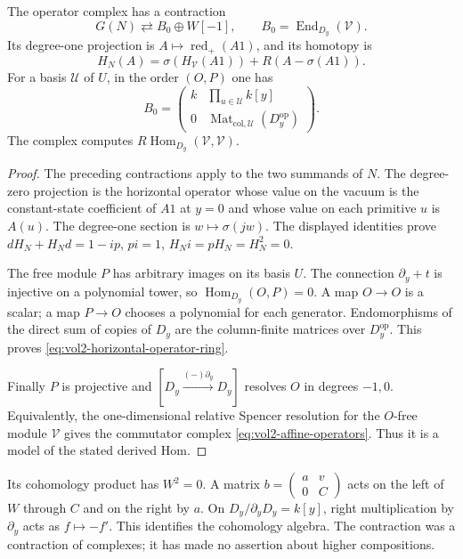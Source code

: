 \begin{theorem}\label{thm:vol2-polynomial-operators}
The operator complex has a contraction
\[
 G(N)\rightleftarrows B_0\oplus W[-1],
 \qquad B_0=\operatorname{End}_{D_y}(\mathcal V).
\]
Its degree-one projection is $A\mapsto\operatorname{red}_+(A1)$,
and its homotopy is
\begin{equation}\label{eq:vol2-operator-homotopy}
 H_N(A)=\sigma(H_{\mathcal V}(A1))+R(A-\sigma(A1)).
\end{equation}
For a basis $\mathcal U$ of $U$, in the order $(O,P)$ one has
\begin{equation}\label{eq:vol2-horizontal-operator-ring}
 B_0=\begin{pmatrix}
 k&\displaystyle\prod_{u\in\mathcal U}k[y]\\
 0&\operatorname{Mat}_{\mathrm{col},\mathcal U}(D_y^{\mathrm{op}})
 \end{pmatrix}.
\end{equation}
The complex computes $R\operatorname{Hom}_{D_y}(\mathcal V,\mathcal V)$.
\end{theorem}
\begin{proof}
The preceding contractions apply to the two summands of $N$.
The degree-zero projection is the horizontal operator whose value
on the vacuum is the constant-state coefficient of $A1$ at $y=0$
and whose value on each primitive $u$ is $A(u)$. The degree-one
section is $w\mapsto\sigma(jw)$. The displayed identities prove
$dH_N+H_Nd=1-ip$, $pi=1$, $H_Ni=pH_N=H_N^2=0$.

The free module $P$ has arbitrary images on its basis $U$.
The connection $\partial_y+t$ is injective on a polynomial tower,
so $\operatorname{Hom}_{D_y}(O,P)=0$. A map $O\to O$ is a
scalar; a map $P\to O$ chooses a polynomial for each generator.
Endomorphisms of the direct sum of copies of $D_y$ are the
column-finite matrices over $D_y^{\mathrm{op}}$. This proves
\eqref{eq:vol2-horizontal-operator-ring}.

Finally $P$ is projective and
$[D_y\xrightarrow{(-)\partial_y}D_y]$ resolves $O$ in degrees
$-1,0$. Equivalently, the one-dimensional relative Spencer
resolution for the $O$-free module $\mathcal V$ gives the
commutator complex \eqref{eq:vol2-affine-operators}. Thus it is
a model of the stated derived Hom.
\end{proof}

Its cohomology product has $W^2=0$. A matrix
$b=\left(\begin{smallmatrix}a&v\\0&C\end{smallmatrix}\right)$
acts on the left of $W$ through $C$ and on the right by $a$.
On $D_y/\partial_yD_y=k[y]$, right multiplication by
$\partial_y$ acts as $f\mapsto-f'$. This identifies the
cohomology algebra. The contraction was a contraction of complexes;
it has made no assertion about higher compositions.

